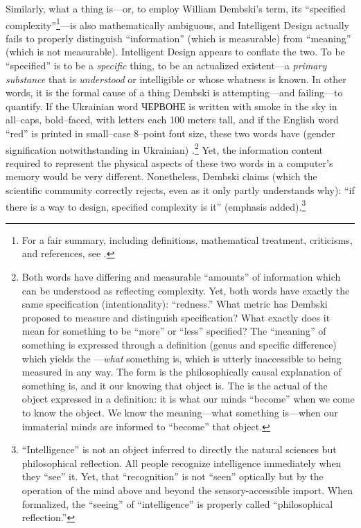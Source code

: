 Similarly, what a thing is---or, to employ William Dembski's term, its ``specified complexity''\footnote{For a fair summary, including definitions, mathematical treatment, criticisms, and references, see \citet{scwp}.}---is also mathematically ambiguous, and Intelligent Design actually fails to properly distinguish ``information'' (which is measurable) from ``meaning'' (which is not measurable).  Intelligent Design appears to conflate the two. To be ``specified'' is to be a \textit{specific} thing, to be an actualized existent---a \textit{primary substance} that is \textit{understood} or intelligible or whose whatness is known. In other words, it is the formal cause of a thing Dembski is attempting---and failing---to quantify.  If the Ukrainian word \foreignlanguage{russian}{ЧЕРВОНЕ} is written with smoke in the sky in all--caps, bold--faced, with letters each 100 meters tall, and if the English word ``red'' is printed in small--case 8--point font size, these two words have (gender signification notwithstanding in Ukrainian) .\footnote{Both words have differing and measurable ``amounts'' of information which can be understood as reflecting complexity. Yet, both words have exactly the same specification (intentionality): ``redness.'' What metric has Dembski proposed to measure and distinguish  specification? What exactly does it mean for something to be  ``more'' or ``less'' specified? The ``meaning'' of something is expressed through a definition (genus and specific difference) which yields the ---\textit{what} something is, which is utterly inaccessible to being measured in any way. The form is the philosophically causal explanation of  something is, and it  our knowing  that object is. The  is the actual  of the object expressed in a definition: it is what our minds ``become'' when we come to know the object. We know the meaning---what something is---when our immaterial minds are informed  to ``become'' that object.} Yet, the information content required to represent the physical aspects of these two words in a computer's memory would be very different.  Nonetheless, Dembski claims (which the scientific community correctly rejects, even as it only partly understands why): ``if there is a way to  design, specified complexity is it'' \citep[][p.~19]{dembskinfl} (emphasis added).\footnote{``Intelligence'' is not an object inferred to directly  the natural sciences but  philosophical reflection. All people recognize intelligence immediately when they ``see'' it. Yet, that ``recognition'' is not ``seen'' optically but by the operation of the mind above and beyond the sensory-accessible import. When formalized, the ``seeing'' of ``intelligence'' is properly called ``philosophical reflection.''}

